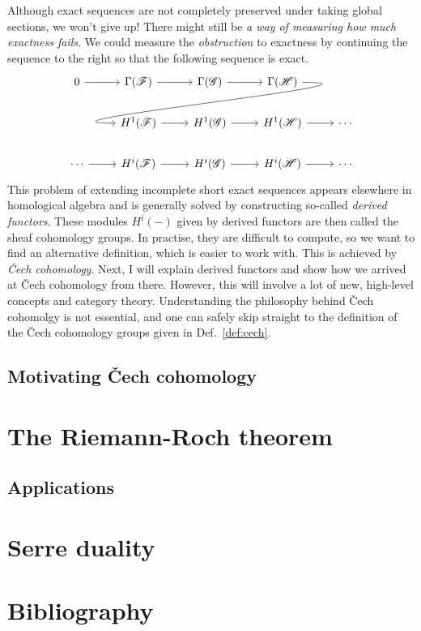 \documentclass[12pt]{article}
\begin{document}
Although exact sequences are not completely preserved under taking
global sections, we won't give up! There might still be \emph{a way of
measuring how much exactness fails}. We could measure the
\emph{obstruction} to exactness by continuing the sequence to the right
so that the following sequence is exact.
\[
\begin{tikzcd}
  0 \arrow{r} & \Gamma(\mathscr{F}) \arrow{r} & \Gamma(\mathscr{G})
  \arrow{r} & \Gamma(\mathscr{H})
  \arrow[out=0, in=180, looseness=1.5, overlay]{dll} & \\
    & H^{1}(\mathscr{F}) \arrow{r} & H^{1}(\mathscr{G})
  \arrow{r} & H^{1}(\mathscr{H}) \arrow{r} & \cdots \\
  \cdots \arrow{r}& H^{i}(\mathscr{F}) \arrow{r} & H^{i}(\mathscr{G})
  \arrow{r} & H^{i}(\mathscr{H}) \arrow{r} & \cdots
\end{tikzcd}
\]
This problem of extending incomplete short exact sequences appears
elsewhere in homological algebra and is generally solved by constructing
so-called \emph{derived functors}. These modules $H^{i}(-)$ given by derived
functors are then called the sheaf cohomology groups. In practise, they are
difficult to compute, so we want to find an alternative definition,
which is easier to work with. This is achieved by \emph{\v Cech cohomology}.
Next, I will explain derived functors and show how we arrived at \v Cech
cohomology from there. However, this will involve a lot of new, high-level
concepts and category theory. Understanding the philosophy behind
\v Cech cohomolgy is not essential, and one can safely skip straight to the
definition of the \v Cech cohomology groups given in Def.~\ref{def:cech}.

\subsection{Motivating \v Cech cohomology}

\section{The Riemann-Roch theorem}
\subsection{Applications}

\section{Serre duality}

\section{Bibliography}


\end{document}
